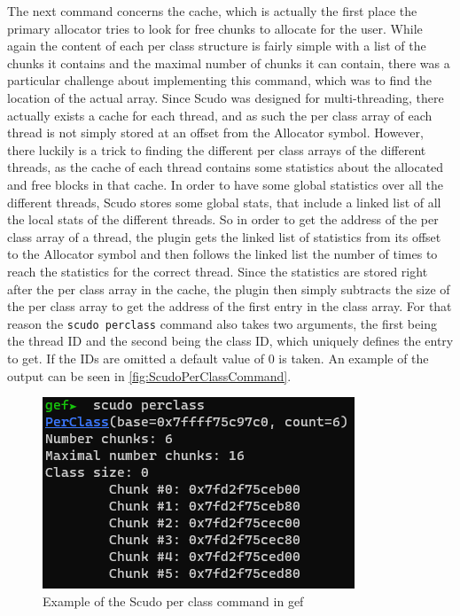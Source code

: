 \documentclass[a4paper,11pt,oneside]{report}
\begin{document}
The next command concerns the cache, which is actually the first place the
primary allocator tries to look for free chunks to allocate for the user.
While again the content of each per class structure is fairly simple with a
list of the chunks it contains and the maximal number of chunks it can contain,
there was a particular challenge about implementing this command, which was to
find the location of the actual array. Since Scudo was designed for
multi-threading, there actually exists a cache for each thread, and as such the per
class array of each thread is not simply stored at an offset from the Allocator
symbol. However, there luckily is a trick to finding the different per class arrays
of the different threads, as the cache of each thread contains some statistics
about the allocated and free blocks in that cache. In order to have some global
statistics over all the different threads, Scudo stores some global stats, that
include a linked list of all the local stats of the different threads. So in
order to get the address of the per class array of a thread, the plugin gets
the linked list of statistics from its offset to the Allocator symbol and then
follows the linked list the number of times to reach the statistics for the
correct thread. Since the statistics are stored right after the per class array
in the cache, the plugin then simply subtracts the size of the per class array
to get the address of the first entry in the class array.
For that reason the \verb|scudo perclass| command also takes two arguments, the first
being the thread ID and the second being the class ID, which uniquely defines
the entry to get. If the IDs are omitted a default value of 0 is taken. An
example of the output can be seen in \autoref{fig:ScudoPerClassCommand}.

\begin{figure}[h!]
  \centering
  \includegraphics{figures/ScudoPerClassCommand.png}
  \caption{Example of the Scudo per class command in gef}
  \label{fig:ScudoPerClassCommand}
\end{figure}
\end{document}

